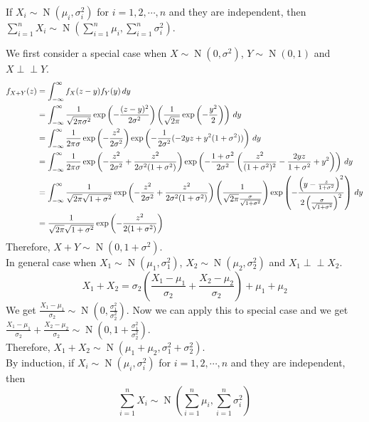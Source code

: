 \documentclass{huhtakm-template-book}
\newcommand{\independent}{\perp\!\!\!\perp}
\DeclareMathOperator{\N}{N}
\begin{document}
\begin{thm}
	\label{Chapter 5 (Theorem) Additivity of Normal Distribution}
	If $X_{i}\sim\N(\mu_{i},\sigma_{i}^{2})$ for $i=1,2,\cdots,n$ and they are independent, then $\sum_{i=1}^{n}X_{i}\sim\N\left(\sum_{i=1}^{n}\mu_{i},\sum_{i=1}^{n}\sigma_{i}^{2}\right)$.
\end{thm}
\begin{proofing}
	We first consider a special case when $X\sim\N(0,\sigma^{2})$, $Y\sim\N(0,1)$ and $X\independent Y$.
	\begin{align*}
		f_{X+Y}(z)&=\int_{-\infty}^{\infty} f_{X}(z-y)f_{Y}(y)\,dy\\
		&=\int_{-\infty}^{\infty}\frac{1}{\sqrt{2\pi\sigma^{2}}}\exp\left(-\frac{(z-y)^{2}}{2\sigma^{2}}\right)\left(\frac{1}{\sqrt{2\pi}}\exp\left(-\frac{y^{2}}{2}\right)\right)\,dy\\
		&=\int_{-\infty}^{\infty}\frac{1}{2\pi\sigma}\exp\left(-\frac{z^{2}}{2\sigma^{2}}\right)\exp\left(-\frac{1}{2\sigma^{2}}(-2yz+y^{2}(1+\sigma^{2}))\right)\,dy\\
		&=\int_{-\infty}^{\infty}\frac{1}{2\pi\sigma}\exp\left(-\frac{z^{2}}{2\sigma^{2}}+\frac{z^{2}}{2\sigma^{2}(1+\sigma^{2})}\right)\exp\left(-\frac{1+\sigma^{2}}{2\sigma^{2}}\left(\frac{z^{2}}{(1+\sigma^{2})^{2}}-\frac{2yz}{1+\sigma^{2}}+y^{2}\right)\right)\,dy\\
		&=\int_{-\infty}^{\infty}\frac{1}{\sqrt{2\pi}\sqrt{1+\sigma^{2}}}\exp\left(-\frac{z^{2}}{2\sigma^{2}}+\frac{z^{2}}{2\sigma^{2}(1+\sigma^{2})}\right)\left(\frac{1}{\sqrt{2\pi}\frac{\sigma}{\sqrt{1+\sigma^{2}}}}\right)\exp\left(-\frac{\left(y-\frac{z}{1+\sigma^{2}}\right)^{2}}{2\left(\frac{\sigma}{\sqrt{1+\sigma^{2}}}\right)^{2}}\right)\,dy\\
		&=\frac{1}{\sqrt{2\pi}\sqrt{1+\sigma^{2}}}\exp\left(-\frac{z^{2}}{2(1+\sigma^{2})}\right)
	\end{align*}
	Therefore, $X+Y\sim\N(0,1+\sigma^{2})$.\\
	In general case when $X_{1}\sim\N(\mu_{1},\sigma_{1}^{2})$, $X_{2}\sim\N(\mu_{2},\sigma_{2}^{2})$ and $X_{1}\independent X_{2}$.
	\begin{equation*}
		X_{1}+X_{2}=\sigma_{2}\left(\frac{X_{1}-\mu_{1}}{\sigma_{2}}+\frac{X_{2}-\mu_{2}}{\sigma_{2}}\right)+\mu_{1}+\mu_{2}
	\end{equation*}
	We get $\frac{X_{1}-\mu_{1}}{\sigma_{2}}\sim\N\left(0,\frac{\sigma_{1}^{2}}{\sigma_{2}^{2}}\right)$. Now we can apply this to special case and we get $\frac{X_{1}-\mu_{1}}{\sigma_{2}}+\frac{X_{2}-\mu_{2}}{\sigma_{2}}\sim\N\left(0,1+\frac{\sigma_{1}^{2}}{\sigma_{2}^{2}}\right)$.\\
	Therefore, $X_{1}+X_{2}\sim\N(\mu_{1}+\mu_{2},\sigma_{1}^{2}+\sigma_{2}^{2})$.\\
	By induction, if $X_{i}\sim\N(\mu_{i},\sigma_{i}^{2})$ for $i=1,2,\cdots,n$ and they are independent, then
	\begin{equation*}
		\sum_{i=1}^{n}X_{i}\sim\N\left(\sum_{i=1}^{n}\mu_{i},\sum_{i=1}^{n}\sigma_{i}^{2}\right)
	\end{equation*}
\end{proofing}
\end{document}
